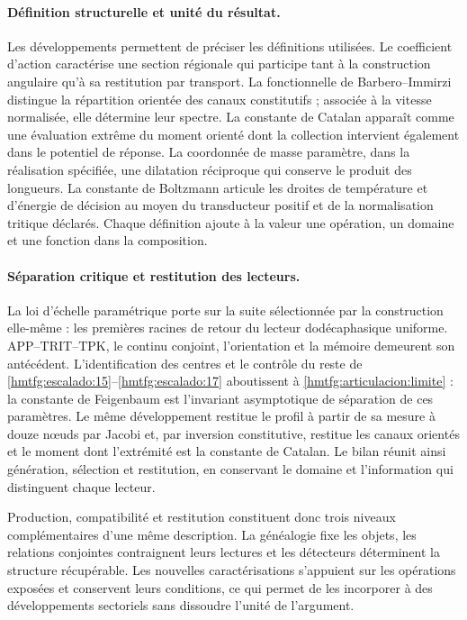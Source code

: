 \paragraph{Définition structurelle et unité du résultat.}
Les développements permettent de préciser les définitions utilisées. Le
coefficient d’action caractérise une section régionale qui participe tant
à la construction angulaire qu’à sa restitution par transport. La
fonctionnelle de Barbero--Immirzi distingue la répartition orientée des canaux
constitutifs ; associée à la vitesse normalisée, elle détermine leur spectre.
La constante de Catalan apparaît comme une évaluation extrême du moment
orienté dont la collection intervient également dans le potentiel de réponse.
La coordonnée de masse paramètre, dans la réalisation spécifiée, une
dilatation réciproque qui conserve le produit des longueurs. La
constante de Boltzmann articule les droites de température et d’énergie de
décision au moyen du transducteur positif et de la normalisation tritique
déclarés. Chaque définition ajoute à la valeur une opération, un domaine et une
fonction dans la composition.

\paragraph{Séparation critique et restitution des lecteurs.}
La loi d’échelle paramétrique porte sur la suite sélectionnée par la construction elle-même : les premières racines de retour du lecteur dodécaphasique uniforme. APP--TRIT--TPK, le continu conjoint, l’orientation et la mémoire demeurent son antécédent. L’identification des centres et le contrôle du reste de \ref{hmtfg:escalado:15}--\ref{hmtfg:escalado:17} aboutissent à \eqref{hmtfg:articulacion:limite} : la constante de Feigenbaum est l’invariant asymptotique de séparation de ces paramètres. Le même développement restitue le profil à partir de sa mesure à douze nœuds par Jacobi et, par inversion constitutive, restitue les canaux orientés et le moment dont l’extrémité est la constante de Catalan. Le bilan réunit ainsi génération, sélection et restitution, en conservant le domaine et l’information qui distinguent chaque lecteur.




Production, compatibilité et restitution constituent donc trois
niveaux complémentaires d’une même description. La généalogie fixe
les objets, les relations conjointes contraignent leurs lectures et les
détecteurs déterminent la structure récupérable. Les nouvelles
caractérisations s’appuient sur les opérations exposées et conservent
leurs conditions, ce qui permet de les incorporer à des développements sectoriels
sans dissoudre l’unité de l’argument.
